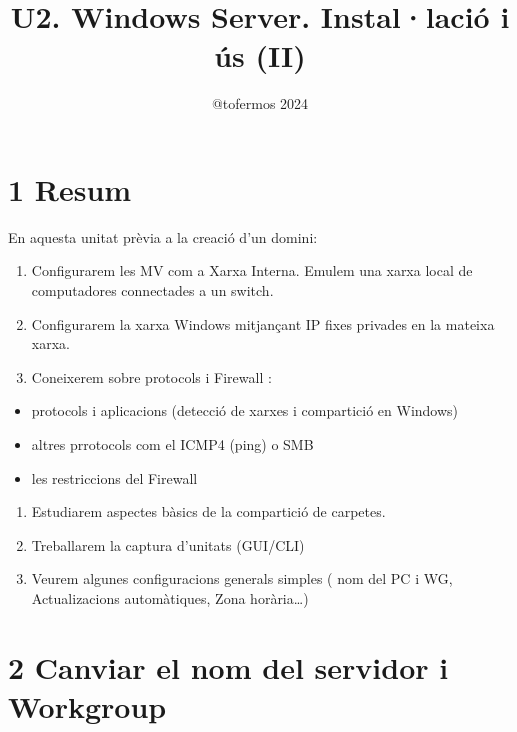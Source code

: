\documentclass[
  a4paper,
]{article}
\title{U2. Windows Server. Instal·lació i ús (II)}
\author{@tofermos 2024}
\date{}
\providecommand{\tightlist}{%
  \setlength{\itemsep}{0pt}\setlength{\parskip}{0pt}}
\begin{document}
\maketitle

{
\setcounter{tocdepth}{2}
\tableofcontents
}
\newpage
\renewcommand\tablename{Tabla}

\section{1 Resum}\label{resum}

En aquesta unitat prèvia a la creació d'un domini:

\begin{enumerate}
\def\labelenumi{\arabic{enumi}.}
\item
  Configurarem les MV com a Xarxa Interna. Emulem una xarxa local de
  computadores connectades a un switch.
\item
  Configurarem la xarxa Windows mitjançant IP fixes privades en la
  mateixa xarxa.
\item
  Coneixerem sobre protocols i Firewall :
\end{enumerate}

\begin{itemize}
\tightlist
\item
  protocols i aplicacions (detecció de xarxes i compartició en Windows)
\item
  altres prrotocols com el ICMP4 (ping) o SMB
\item
  les restriccions del Firewall
\end{itemize}

\begin{enumerate}
\def\labelenumi{\arabic{enumi}.}
\setcounter{enumi}{3}
\item
  Estudiarem aspectes bàsics de la compartició de carpetes.
\item
  Treballarem la captura d'unitats (GUI/CLI)
\item
  Veurem algunes configuracions generals simples ( nom del PC i WG,
  Actualizacions automàtiques, Zona horària\ldots)
\end{enumerate}

\section{2 Canviar el nom del servidor i
Workgroup}\label{canviar-el-nom-del-servidor-i-workgroup}
\end{document}
